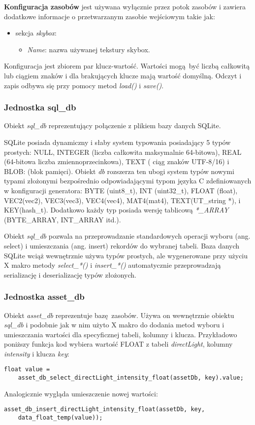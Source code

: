 \textbf{Konfiguracja zasobów} jest używana wyłącznie przez potok zasobów i zawiera dodatkowe informacje o przetwarzanym zasobie wejściowym takie jak:
\begin{itemize}
	\item sekcja \textit{skybox}:
	\begin{itemize}
		\item \textit{Name}: nazwa używanej tekstury skybox.
	\end{itemize}
\end{itemize}

Konfiguracja jest zbiorem par klucz-wartość.
Wartości mogą być liczbą całkowitą lub ciągiem znaków i dla brakujących klucze mają wartość domyślną.
Odczyt i zapis odbywa się przy pomocy metod \textit{load()} i \textit{save()}.


\subsubsection{Jednostka sql\_db}
Obiekt \textit{sql\_db} reprezentujący połączenie z plikiem bazy danych SQLite.

SQLite posiada dynamiczny i słaby system typowania posiadający 5 typów prostych:
NULL, INTEGER (liczba całkowita maksymalnie 64-bitowa), REAL (64-bitowa liczba zmiennoprzecinkowa), TEXT ( ciąg znaków UTF-8/16) i BLOB: (blok pamięci).
Obiekt \textit{db} rozszerza ten ubogi system typów nowymi typami złożonymi bezpośrednio odpowiadającymi typom języka C zdefiniowanych w konfiguracji generatora: BYTE (uint8\_t), INT (uint32\_t), FLOAT (float), VEC2(vec2), VEC3(vec3), VEC4(vec4), MAT4(mat4), TEXT(UT\_string *), i KEY(hash\_t).
Dodatkowo każdy typ posiada wersję tablicową \textit{*\_ARRAY} (BYTE\_ARRAY, INT\_ARRAY itd.).

Obiekt \textit{sql\_db} pozwala na przeprowadzanie standardowych operacji wyboru (ang. select) i umieszczania (ang. insert) rekordów do wybranej tabeli.
Baza danych SQLite wciąż wewnętrznie używa typów prostych, ale wygenerowane przy użyciu X makro metody \textit{select\_*()} i \textit{insert\_*()} automatycznie przeprowadzają serializację i deserializację typów złożonych.


\subsubsection{Jednostka asset\_db}
Obiekt \textit{asset\_db} reprezentuje bazę zasobów.
Używa on wewnętrznie obiektu \textit{sql\_db} i podobnie jak w nim użyto X makro do dodania metod wyboru i umieszczania wartości dla specyficznej tabeli, kolumny i klucza.
Przykładowo poniższy funkcja kod wybiera wartość FLOAT z tabeli \textit{directLight}, kolumny \textit{intensity} i klucza \textit{key}:
\lstset{language=C}
\begin{lstlisting}
float value =
	asset_db_select_directLight_intensity_float(assetDb, key).value;
\end{lstlisting}
Analogicznie wygląda umieszczenie nowej wartości:
\lstset{language=C}
\begin{lstlisting}
asset_db_insert_directLight_intensity_float(assetDb, key,
	data_float_temp(value));
\end{lstlisting}

